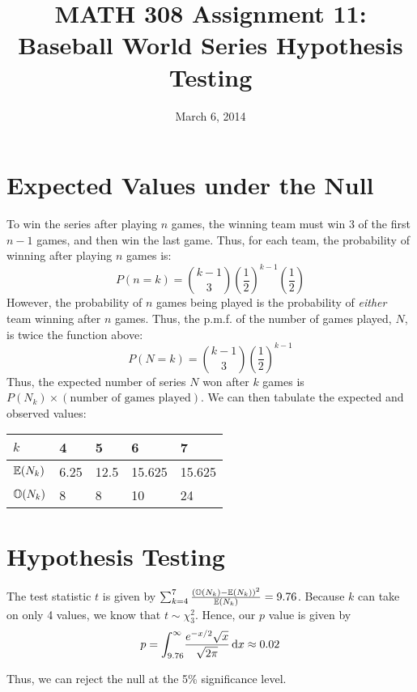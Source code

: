 \documentclass[twocolumn]{article}
\title{MATH 308 Assignment 11:\\Baseball World Series Hypothesis Testing}
\date{March 6, 2014}
\newcommand{\h}{\frac{1}{2}}
\begin{document}
\maketitle

\section{Expected Values under the Null}
To win the series after playing $n$ games, the winning team must win 3 of the first $n-1$ games, and then win the last game. Thus, for each team, the probability of winning after playing $n$ games is:\[
	P(n=k)=\binom{k-1}{3} \left(\h\right)^{k-1}\left(\h\right)
\]
However, the probability of $n$ games being played is the probability of \emph{either} team winning after $n$ games. Thus, the p.m.f. of the number of games played, $N$, is twice the function above:\[
	P(N=k)=\binom{k-1}{3} \left(\h\right)^{k-1}
\]
Thus, the expected number of series $N$ won after $k$ games is $P(N_k)\times(\text{number of games played})$. We can then tabulate the expected and observed values:
\begin{table}[h]
\begin{tabular}{@{}lllll@{}}
\toprule
$k$ & 4    & 5    & 6      & 7      \\ \midrule
$\mathbb{E}(N_k)$ & 6.25 & 12.5 & 15.625 & 15.625 \\
$\mathbb{O}(N_k)$ & 8    & 8    & 10     & 24     \\ \bottomrule
\end{tabular}
\end{table}

\newpage

\section{Hypothesis Testing}
The test statistic $t$ is given by $\sum_{k=4}^7 \frac{(\mathbb{O}(N_k)-\mathbb{E}(N_k))^2}{\mathbb{E}(N_k)}=9.76$. Because $k$ can take on only 4 values, we know that $t\sim\chi^2_3$. Hence, our $p$ value is given by\[
p=
\int_{9.76}^{\infty} \! 
	\frac{e^{-x/2}\sqrt{x}}{\sqrt{2\pi}}
 \, \mathrm{d} x
\approx 0.02
\]

Thus, we can reject the null at the 5\% significance level.
\end{document}
